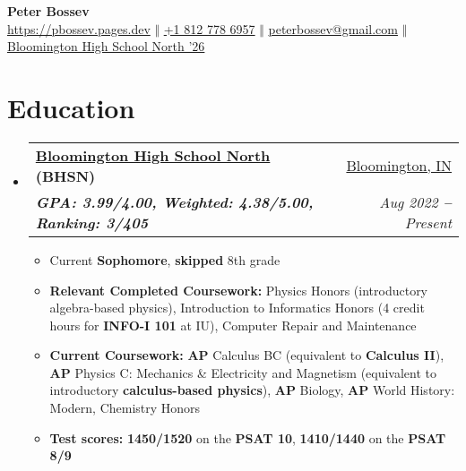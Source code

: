 \documentclass[letterpaper,9pt]{article}
\makeatletter
\newcommand{\cvSubItem}[1]{
  \item\small{
    {#1 \vspace{-2pt}}
  }
}
\newcommand{\cvFour}[4]{
  \vspace{-2pt}\item
    \begin{tabular*}{1\textwidth}[t]{l@{\extracolsep{\fill}}r}
      \textbf{#1} & #2 \\
      \textit{\small#3} & \textit{\small #4} \\
    \end{tabular*}\vspace{-5pt}
}
\newcommand{\cvBodyStart}{\begin{itemize}[leftmargin=0.15in, label={}]}
\newcommand{\cvBodyEnd}{\end{itemize}}
\newcommand{\cvListStart}{\begin{itemize}}
\newcommand{\cvListEnd}{\end{itemize}\vspace{-5pt}}
\makeatother
\begin{document}
\begin{center}
	\textbf{{\huge \color{black} Peter Bossev}}\\ \vspace{10pt}
    \small
    \faLink \hspace{.5pt} \href{https://pbossev.pages.dev}
    {https://pbossev.pages.dev}
    \large $\Vert$ \small
    \faMobile \hspace{.5pt} \href{tel:18127786957}
    {+1 812 778 6957}
    \large $\Vert$ \small
    \faAt \hspace{.5pt} \href{mailto:peterbossev@gmail.com}
    {peterbossev@gmail.com}
    \large $\Vert$ \small
    \faGlobe \hspace{.5pt}
    \href{https://north.mccsc.edu/}{Bloomington High School North '26}
\end{center}

\section{Education}
\cvBodyStart
    \cvFour{\href{https://north.mccsc.edu/}{Bloomington High School North} (BHSN)}{\href{https://www.google.com/maps/place/Bloomington,+IN}{Bloomington, IN}}
      {\textbf{GPA: 3.99/4.00, Weighted: 4.38/5.00, Ranking: 3/405}}{Aug 2022 \textbf{--} Present}
       \cvListStart
             \cvSubItem{Current \textbf{Sophomore}, \textbf{skipped} 8th grade}
             \cvSubItem{\textbf{Relevant Completed Coursework:} Physics Honors (introductory algebra-based physics), Introduction to Informatics Honors (4 credit hours for \textbf{INFO-I 101} at IU), Computer Repair and Maintenance}
             \cvSubItem{\textbf{Current Coursework:} \textbf{AP} Calculus BC (equivalent to \textbf{Calculus II}), \textbf{AP} Physics C: Mechanics \& Electricity and Magnetism (equivalent to introductory \textbf{calculus-based physics}), \textbf{AP} Biology, \textbf{AP} World History: Modern, Chemistry Honors}
             \cvSubItem{\textbf{Test scores:} \textbf{1450/1520} on the \textbf{PSAT 10}, \textbf{1410/1440} on the \textbf{PSAT 8/9}}
        \cvListEnd
\cvBodyEnd
\end{document}
